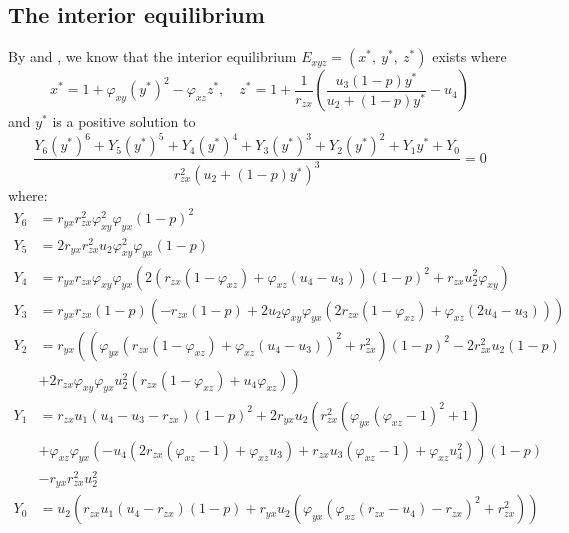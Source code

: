 \subsection{The interior equilibrium}\label{subsec:numsim_interior_equilibrium}
By  and , we know that the interior equilibrium $E_{xyz}=\left(x^*,\ y^*,\ z^*\right)$ exists where
\begin{equation*}
    x^*=1+\varphi_{xy}\left(y^*\right)^2-\varphi_{xz}z^*,\quad 
    z^*=1+\frac{1}{r_{zx}}\left(\frac{u_3\left(1-p\right)y^*}{u_2+\left(1-p\right)y^*}-u_4\right)
\end{equation*}
and $y^*$ is a positive solution to 
\begin{equation*}
    \frac{Y_6\left(y^*\right)^6+Y_5\left(y^*\right)^5+Y_4\left(y^*\right)^4+Y_3\left(y^*\right)^3+Y_2\left(y^*\right)^2+Y_1y^*+Y_0}{r_{zx}^2\left(u_2+\left(1-p\right)y^*\right)^3}=0
\end{equation*}
where:
\begin{align*}
    Y_6 &= r_{yx}r_{zx}^2\varphi_{xy}^2\varphi_{yx}\left(1-p\right)^2\\
    Y_5 &= 2r_{yx}r_{zx}^2u_2\varphi_{xy}^2\varphi_{yx}\left(1-p\right)\\
    Y_4 &= r_{yx}r_{zx}\varphi_{xy}\varphi_{yx}\left(2\left(r_{zx}\left(1-\varphi_{xz}\right)+\varphi_{xz}\left(u_4-u_3\right)\right)\left(1-p\right)^2+r_{zx}u_2^2\varphi_{xy}\right)\\
    Y_3 &= r_{yx}r_{zx}\left(1-p\right)\left(-r_{zx}\left(1-p\right)+2u_2\varphi_{xy}\varphi_{yx}\left(2r_{zx}\left(1-\varphi_{xz}\right)+\varphi_{xz}\left(2u_4-u_3\right)\right)\right)\\
    Y_2 &= r_{yx}\left(\left(\varphi_{yx}\left(r_{zx}\left(1-\varphi_{xz}\right)+\varphi_{xz}\left(u_4-u_3\right)\right)^2+r_{zx}^2\right)\left(1-p\right)^2-2r_{zx}^2u_2\left(1-p\right)\right.\\
    &\left.+2r_{zx}\varphi_{xy}\varphi_{yx}u_2^2\left(r_{zx}\left(1-\varphi_{xz}\right)+u_4\varphi_{xz}\right)\right)\\
    Y_1 &= r_{zx}u_1\left(u_4-u_3-r_{zx}\right)\left(1-p\right)^2+2r_{yx}u_2\left(r_{zx}^2\left(\varphi_{yx}\left(\varphi_{xz}-1\right)^2+1\right)\right.\\
    &\left.+\varphi_{xz}\varphi_{yx}\left(-u_4\left(2r_{zx}\left(\varphi_{xz}-1\right)+\varphi_{xz}u_3\right)+r_{zx}u_3\left(\varphi_{xz}-1\right)+\varphi_{xz}u_4^2\right)\right)\left(1-p\right)\\
    &-r_{yx}r_{zx}^2u_2^2\\
    Y_0 &= u_2\left(r_{zx}u_1\left(u_4-r_{zx}\right)\left(1-p\right)+r_{yx}u_2\left(\varphi_{yx}\left(\varphi_{xz}\left(r_{zx}-u_4\right)-r_{zx}\right)^2+r_{zx}^2\right)\right)
\end{align*}

